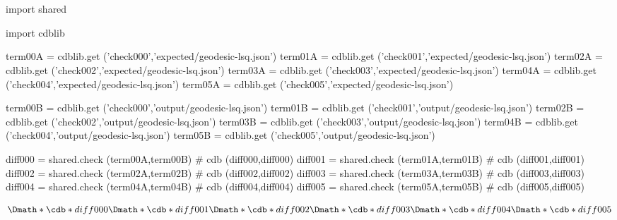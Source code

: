 \documentclass[12pt]{cdblatex}
\begin{document}
\section*{\jobname}


\begin{cadabra}
   import shared

   import cdblib

   term00A = cdblib.get ('check000','expected/geodesic-lsq.json')
   term01A = cdblib.get ('check001','expected/geodesic-lsq.json')
   term02A = cdblib.get ('check002','expected/geodesic-lsq.json')
   term03A = cdblib.get ('check003','expected/geodesic-lsq.json')
   term04A = cdblib.get ('check004','expected/geodesic-lsq.json')
   term05A = cdblib.get ('check005','expected/geodesic-lsq.json')

   term00B = cdblib.get ('check000','output/geodesic-lsq.json')
   term01B = cdblib.get ('check001','output/geodesic-lsq.json')
   term02B = cdblib.get ('check002','output/geodesic-lsq.json')
   term03B = cdblib.get ('check003','output/geodesic-lsq.json')
   term04B = cdblib.get ('check004','output/geodesic-lsq.json')
   term05B = cdblib.get ('check005','output/geodesic-lsq.json')

   diff000 = shared.check (term00A,term00B)   # cdb (diff000,diff000)
   diff001 = shared.check (term01A,term01B)   # cdb (diff001,diff001)
   diff002 = shared.check (term02A,term02B)   # cdb (diff002,diff002)
   diff003 = shared.check (term03A,term03B)   # cdb (diff003,diff003)
   diff004 = shared.check (term04A,term04B)   # cdb (diff004,diff004)
   diff005 = shared.check (term05A,term05B)   # cdb (diff005,diff005)

\end{cadabra}

\begin{dgroup*}
   \Dmath*{ \cdb*{diff000} }
   \Dmath*{ \cdb*{diff001} }
   \Dmath*{ \cdb*{diff002} }
   \Dmath*{ \cdb*{diff003} }
   \Dmath*{ \cdb*{diff004} }
   \Dmath*{ \cdb*{diff005} }
\end{dgroup*}
\end{document}
